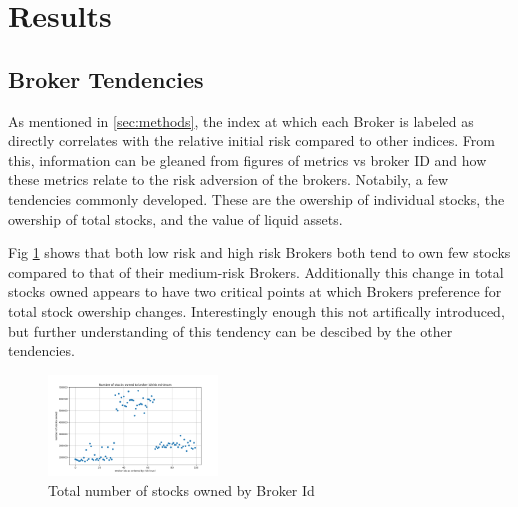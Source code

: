 \documentclass[letterpaper, 10 pt, proceedings]{ieeetran}
\begin{document}
	\section{Results}\label{sec:results}
	
	\subsection{Broker Tendencies}\label{subsec:tendencies}	
	As mentioned in \ref{sec:methods}, the index at which each Broker is labeled as directly correlates with the relative initial risk compared to other indices. From this, information can be gleaned from figures of metrics vs broker ID and how these metrics relate to the risk adversion of the brokers. Notabily, a few tendencies commonly developed. These are the owership of individual stocks, the owership of total stocks, and the value of liquid assets.\par
	Fig \ref{totalvID} shows that both low risk and high risk Brokers both tend to own few stocks compared to that of their medium-risk Brokers. Additionally this change in total stocks owned appears to have two critical points at which Brokers preference for total stock owership changes. Interestingly enough this not artifically introduced, but further understanding of this tendency can be descibed by the other tendencies. \par

	\begin{figure}[h]
		\centering
		\twocolumn
		\includegraphics[width=0.4\textwidth]{stocksOwnedToBrokerIds.png}
		\caption{Total number of stocks owned by Broker Id}
		\label{totalvID}
	\end{figure}
	\FloatBarrier
\end{document}
